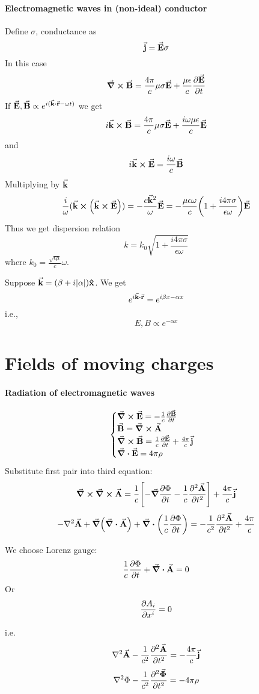 \paragraph{Electromagnetic waves in (non-ideal) conductor}
Define $\sigma$, conductance as
$$\va{j} = \va{E} \sigma$$
In this case
$$\curl{\va{B}} = \frac{4\pi}{c} \mu \sigma \va{E} + \frac{\mu \epsilon}{c}\pdv{\va{E}}{t}$$
If $\va{E},\va{B} \propto e^{i(\va{k}\vdot \va{r} - \omega t)}$ we get
$$i\va{k} \cross \va{B} = \frac{4\pi}{c} \mu \sigma \va{E} + \frac{i\omega \mu \epsilon}{c}\va{E}$$
and
$$i\va{k} \cross \va{E} = \frac{i\omega}{c} \va{B}$$
Multiplying by $\va{k}$
$$\frac{i}{\omega} (\va{k} \cross \qty(\va{k} \cross \va{E})) = -\frac{c\va{k}^2}{\omega} \va{E} = -\frac{\mu \epsilon \omega}{c} \qty(1+\frac{i4\pi \sigma}{\epsilon \omega})\va{E}$$
Thus we get dispersion relation
$$k = k_0\sqrt{1+\frac{i4\pi \sigma}{\epsilon \omega}}$$
where $k_0 = \frac{\sqrt{\epsilon \mu}}{c}\omega$.

Suppose $\va{k} = (\beta+i\abs{\alpha})\vu{x}$. We get
$$e^{i \va{k}\vdot \va{r}} = e^{i\beta x - \alpha x}$$
i.e.,
$$E,B \propto e^{-\alpha x}$$
\section{Fields of moving charges}
\paragraph{Radiation of electromagnetic waves}
$$\begin{cases}
\curl{\va{E}} = - \frac{1}{c} \pdv{\va{B}}{t}\\
\va{B}=\curl{\va{A}}\\
\curl{\va{B}} =  \frac{1}{c} \pdv{\va{E}}{t} + \frac{4\pi}{c} \va{j}\\
\div{\va{E}} = 4\pi \rho
\end{cases}$$
Substitute first pair into third equation:
$$\curl{\curl{\va{A}}} = \frac{1}{c} \qty[-\grad{\pdv{\Phi}{t}} - \frac{1}{c} \pdv[2]{\va{A}}{t}] + \frac{4\pi}{c} \va{j}$$
$$-\laplacian{\va{A}} + \grad(\div{\va{A}}) + \div(\frac{1}{c} \pdv{\Phi}{t}) = -\frac{1}{c^2} \pdv[2]{\va{A}}{t} + \frac{4\pi}{c}$$

We choose Lorenz gauge:
$$\frac{1}{c} \pdv{\Phi}{t} + \div{\va{A}} = 0$$
Or
$$\pdv{A_i}{x^i} = 0$$

i.e.
$$\laplacian{\va{A}} -\frac{1}{c^2} \pdv[2]{\va{A}}{t} = -\frac{4\pi}{c}\va{j}$$
$$\laplacian{\Phi} -\frac{1}{c^2} \pdv[2]{\va{\Phi}}{t} = -4\pi \rho$$


